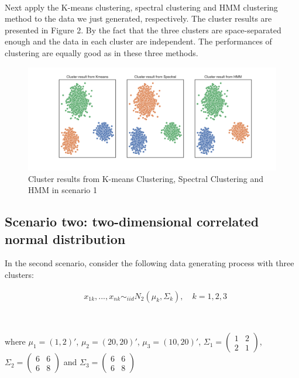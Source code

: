 \documentclass[a4paper]{article}
\begin{document}
\

Next apply the K-means clustering, spectral clustering and HMM clustering method to the data we just generated, respectively. The cluster results are presented in Figure 2. By the fact that the three clusters are space-separated enough and the data in each cluster are independent. The performances of clustering are equally good as in these three methods.

\begin{figure}[h!]
  \centering
  \includegraphics[width=0.8\linewidth]{../Simu_results/sen1_clust.png}
  \caption{Cluster results from K-means Clustering, Spectral Clustering and HMM in scenario 1}
  \label{fig:sec}
\end{figure}


\subsection{Scenario two: two-dimensional correlated normal distribution}

In the second scenario, consider the following data generating process with three clusters:

\begin{align}
	& x_{1k}, ..., x_{nk} \sim_{iid} N_2 (\mu_k,  \Sigma_k), \quad k = 1, 2, 3
\end{align}

\

where $\mu_1 = (1, 2)'$, $\mu_2 = (20, 20)'$, $\mu_3 = (10, 20)'$, 
$\Sigma_1 = \left( \begin{smallmatrix} 1&2\\ 2&1 \end{smallmatrix} \right)$, $\Sigma_2 = \left( \begin{smallmatrix} 6&6\\ 6&8 \end{smallmatrix} \right)$ and $\Sigma_3 = \left( \begin{smallmatrix} 6&6\\ 6&8 \end{smallmatrix} \right)$
\end{document}
